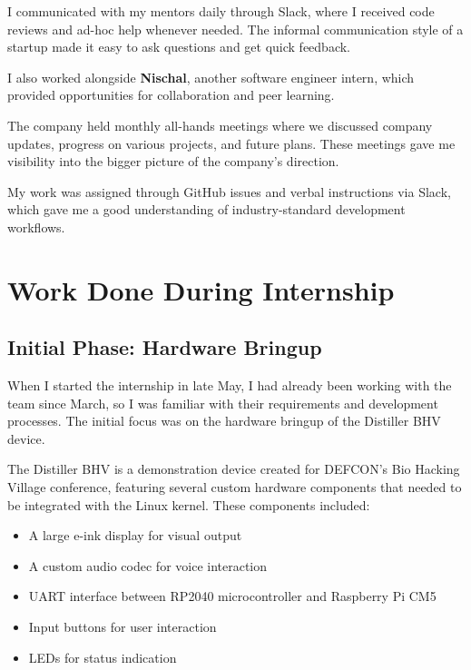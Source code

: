 \documentclass[12pt,a4paper]{report}
\begin{document}
\vspace{0.3cm}

I communicated with my mentors daily through Slack, where I received code reviews and ad-hoc help whenever needed. The informal communication style of a startup made it easy to ask questions and get quick feedback.

\vspace{0.3cm}

I also worked alongside \textbf{Nischal}, another software engineer intern, which provided opportunities for collaboration and peer learning.

\vspace{0.3cm}

The company held monthly all-hands meetings where we discussed company updates, progress on various projects, and future plans. These meetings gave me visibility into the bigger picture of the company's direction.

\vspace{0.3cm}

My work was assigned through GitHub issues and verbal instructions via Slack, which gave me a good understanding of industry-standard development workflows.

\chapter{Work Done During Internship}

\section{Initial Phase: Hardware Bringup}

When I started the internship in late May, I had already been working with the team since March, so I was familiar with their requirements and development processes. The initial focus was on the hardware bringup of the Distiller BHV device.

\vspace{0.3cm}

The Distiller BHV is a demonstration device created for DEFCON's Bio Hacking Village conference, featuring several custom hardware components that needed to be integrated with the Linux kernel. These components included:

\begin{itemize}[itemsep=0.2cm]
    \item A large e-ink display for visual output
    \item A custom audio codec for voice interaction
    \item UART interface between RP2040 microcontroller and Raspberry Pi CM5
    \item Input buttons for user interaction
    \item LEDs for status indication
\end{itemize}
\end{document}
